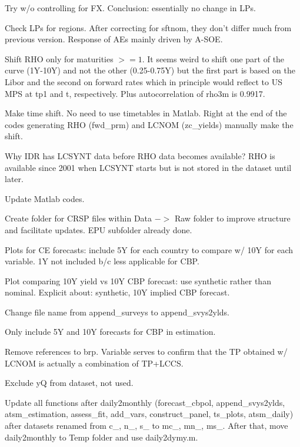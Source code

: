 \documentclass[12pt]{article}
\newcommand{\cmark}{\ding{51}}
\newcommand{\xmark}{\ding{55}}
\newcommand{\done}{\rlap{$\square$}{\raisebox{2pt}{\large\hspace{1pt}\cmark}}%
	\hspace{-2.5pt}}
\newcommand{\wontdo}{\rlap{$\square$}{\large\hspace{1pt}\xmark}}
\begin{document}
\begin{todolist}
\begin{todolist}
		\item[\done] Try w/o controlling for FX. Conclusion: essentially no change in LPs.
		\item[\done] Check LPs for regions. After correcting for sftnom, they don't differ much from previous version. Response of AEs mainly driven by A-SOE.
		\item[\done] Shift RHO only for maturities \(>= 1\). It seems weird to shift one part of the curve (1Y-10Y) and not the other (0.25-0.75Y) but the first part is based on the Libor and the second on forward rates which in principle would reflect to US MPS at tp1 and t, respectively. Plus autocorrelation of rho3m is 0.9917.
		\item[\done] Make time shift. No need to use timetables in Matlab. Right at the end of the codes generating RHO (fwd_prm) and LCNOM (zc_yields) manually make the shift.
		\item[\done] Why IDR has LCSYNT data before RHO data becomes available? RHO is available since 2001 when LCSYNT starts but is not stored in the dataset until later.
	\end{todolist}
	\item[\done] Update Matlab codes.
	\begin{todolist}
		\item[\done] Create folder for CRSP files within Data \(->\) Raw folder to improve structure and facilitate updates. EPU subfolder already done.
		\item[\done] Plots for CE forecasts: include 5Y for each country to compare w/ 10Y for each variable. 1Y not included b/c less applicable for CBP.
		\item[\done] Plot comparing 10Y yield vs 10Y CBP forecast: use synthetic rather than nominal. Explicit about: synthetic, 10Y implied CBP forecast. 
		\item[\done] Change file name from append_surveys to append_svys2ylds.
		\item[\done] Only include 5Y and 10Y forecasts for CBP in estimation.
		\item[\wontdo] Remove references to brp. Variable serves to confirm that the TP obtained w/ LCNOM is actually a combination of TP+LCCS.
		\item[\done] Exclude yQ from dataset, not used.
		\item[\done] Update all functions after daily2monthly (forecast_cbpol, append_svys2ylds, atsm_estimation, assess_fit, add_vars, construct_panel, ts_plots, atsm_daily) after datasets renamed from c_, n_, s_ to mc_, mn_, ms_. After that, move daily2monthly to Temp folder and use daily2dymy.m.

\end{todolist}
\end{todolist}
\end{document}
